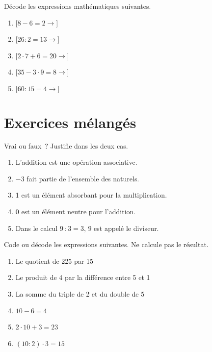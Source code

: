 \documentclass[syllabus_1.tex]{subfiles}
\begin{document}
\begin{exercise}
    Décode les expressions mathématiques suivantes.
    \begin{enumerate}[itemsep=0.8cm]
        \item {}[\(8 - 6 = 2 \rightarrow \)]
        \item {}[\(26:2 = 13 \rightarrow \)]
        \item {}[\(2 \cdot 7 + 6 = 20 \rightarrow \)]
        \item {}[\(35 - 3 \cdot 9 = 8 \rightarrow \)]
        \item {}[\(60 : 15 = 4 \rightarrow \)]
    \end{enumerate}
\end{exercise}

\section{Exercices mélangés}
\begin{exercise}
    Vrai ou faux~? Justifie dans les deux cas.
    \begin{enumerate}
        \item L'addition est une opération associative.
        \item $-3$ fait partie de l'ensemble des naturels.
        \item 1 est un élément absorbant pour la multiplication.
        \item 0 est un élément neutre pour l'addition.
        \item Dans le calcul \(9\ :3 = 3\), \(9\) est appelé le diviseur.
    \end{enumerate}
\end{exercise}

\begin{exercise}
    Code ou décode les expressions suivantes. Ne calcule pas le résultat.
    \begin{enumerate}
        \item Le quotient de 225 par 15~
        \item Le produit de 4 par la différence entre 5 et 1
        \item La somme du triple de 2 et du double de 5
        \item \(10 - 6 = 4\)~
        \item \(2 \cdot 10 + 3 = 23\)~
        \item \((10 : 2) \cdot 3 = 15\)~
    \end{enumerate}
\end{exercise}
\end{document}
